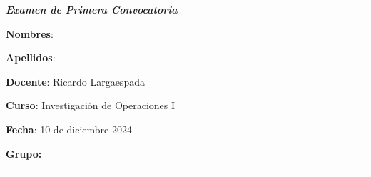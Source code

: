 \documentclass[11pt,paper=a4,answers, addpoints]{exam}
\begin{document}
\noprintanswers
\shorthandoff{<>}
\thispagestyle{empty}
\begin{center}
    \textit{\textbf{Examen de Primera Convocatoria}}
\end{center}
\noindent
\vspace{-.1cm}
\begin{minipage}[t]{.6\textwidth}%
  {\bfseries Nombres}: \makebox[.75\textwidth]{\hrulefill} \par
  {\bfseries Apellidos}: \makebox[.75\textwidth]{\hrulefill} \par
  {\bfseries Docente}: Ricardo Largaespada
\end{minipage}%
\hfill
\begin{minipage}[t]{.4\textwidth}%
  {\bfseries Curso}: Investigación de Operaciones I \par
  {\bfseries Fecha}: 10 de diciembre 2024 \par
  {\bfseries Grupo:} 
  \vspace{1ex}
\end{minipage}    \hfill
  \rule{\textwidth}{1pt}

\end{document}
